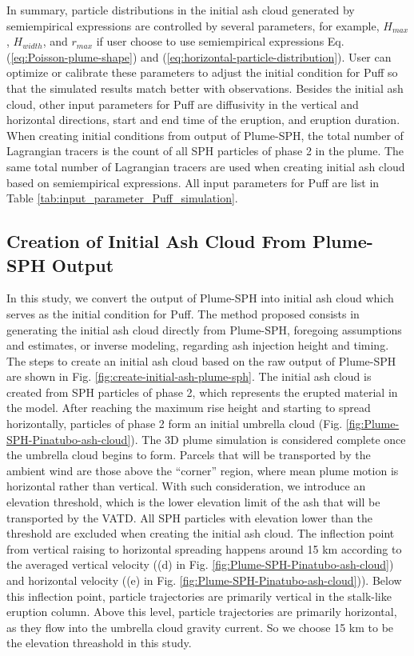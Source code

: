 \documentclass[utf8]{frontiersSCNS} %
\begin{document}
In summary, particle distributions in the initial ash cloud generated by semiempirical expressions are controlled by several parameters, for example, $H_{max}$, $H_{width}$, and $r_{max}$ if user choose to use  semiempirical expressions Eq. (\ref{eq:Poisson-plume-shape}) and (\ref{eq:horizontal-particle-distribution}). User can optimize or calibrate these parameters to adjust the initial condition for Puff so that the simulated results match better with observations. 
Besides the initial ash cloud, other input parameters for Puff are diffusivity in the vertical and horizontal directions, start and end time of the eruption, and eruption duration. When creating initial conditions from output of Plume-SPH, the total number of Lagrangian tracers is the count of all SPH particles of phase 2 in the plume. The same total number of Lagrangian tracers are used when creating initial ash cloud based on semiempirical expressions. All input parameters for Puff are list in Table \ref{tab:input_parameter_Puff_simulation}.

\subsection{Creation of Initial Ash Cloud From Plume-SPH Output} \label{sec:create-initial-condition}
In this study, we convert the output of Plume-SPH into initial ash cloud which serves as the initial condition for Puff. The method proposed consists in generating the initial ash cloud directly from Plume-SPH, foregoing assumptions and estimates, or inverse modeling, regarding ash injection height and timing.
The steps to create an initial ash cloud based on the raw output of Plume-SPH are shown in Fig. \ref{fig:create-initial-ash-plume-sph}.
The initial ash cloud is created from SPH particles of phase 2, which represents the erupted material in the model. After reaching the maximum rise height and starting to spread horizontally, particles of phase 2 form an initial umbrella cloud (Fig. \ref{fig:Plume-SPH-Pinatubo-ash-cloud}). The 3D plume simulation is considered complete once the umbrella cloud begins to form. Parcels that will be transported by the ambient wind are those above the ``corner'' region, where mean plume motion is horizontal rather than vertical. With such consideration, we introduce an elevation threshold, which is the lower elevation limit of the ash that will be transported by the VATD. All SPH particles with elevation lower than the threshold are excluded when creating the initial ash cloud. The inflection point from vertical raising to horizontal spreading happens around 15 km according to the averaged vertical velocity ((d) in Fig. \ref{fig:Plume-SPH-Pinatubo-ash-cloud}) and horizontal velocity  ((e) in Fig. \ref{fig:Plume-SPH-Pinatubo-ash-cloud})).  Below this inflection point, particle trajectories are primarily vertical in the stalk-like eruption column. Above this level, particle trajectories are primarily horizontal, as they flow into the umbrella cloud gravity current. So we choose 15 km to be the elevation threashold in this study.
\end{document}
